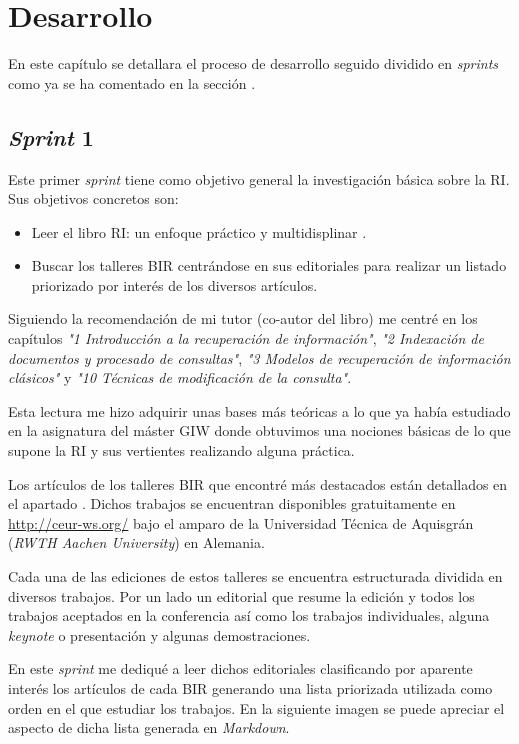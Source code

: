 \chapter{Desarrollo}
En este capítulo se detallara el proceso de desarrollo seguido dividido en \textit{sprints} como ya se ha comentado en la sección .


\section{\textit{Sprint} 1}
Este primer \textit{sprint} tiene como objetivo general la investigación básica sobre la \acrshort{RI}. Sus objetivos concretos son: 

\begin{itemize}
	\item Leer el libro \acrlong{RI}: un enfoque práctico y multidisplinar \cite{RIspaBook}.
	\item Buscar los talleres \acrshort{BIR} centrándose en sus editoriales para realizar un listado priorizado por interés de los diversos artículos.
\end{itemize}

Siguiendo la recomendación de mi tutor (co-autor del libro) me centré en los capítulos \textit{"1 Introducción a la recuperación de información"}, \textit{"2 Indexación de documentos y procesado de consultas"}, \textit{"3 Modelos de recuperación de información clásicos"} y \textit{"10 Técnicas de modificación de la consulta"}. 

Esta lectura me hizo adquirir unas bases más teóricas a lo que ya había estudiado en la asignatura del máster \acrlong{GIW} donde obtuvimos una nociones básicas de lo que supone la \acrshort{RI} y sus vertientes realizando alguna práctica.

Los artículos de los talleres \acrlong{BIR} que encontré más destacados están detallados en el apartado . Dichos trabajos se encuentran disponibles gratuitamente en \url{http://ceur-ws.org/} bajo el amparo de la Universidad Técnica de Aquisgrán (\textit{RWTH Aachen University}) en Alemania.

Cada una de las ediciones de estos talleres se encuentra estructurada dividida en diversos trabajos. Por un lado un editorial que resume la edición y todos los trabajos aceptados en la conferencia así como los trabajos individuales, alguna \textit{keynote} o presentación y algunas demostraciones. 

En este \textit{sprint} me dediqué a leer dichos editoriales clasificando por aparente interés los artículos de cada \acrshort{BIR} generando una lista priorizada utilizada como orden en el que estudiar los trabajos. En la siguiente imagen se puede apreciar el aspecto de dicha lista generada en \textit{Markdown}.


